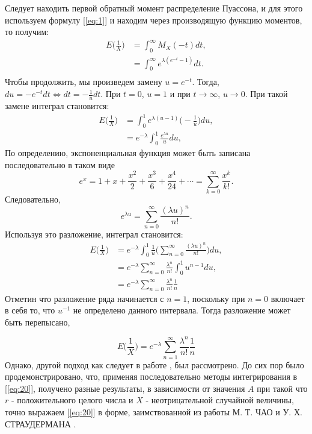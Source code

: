 \documentclass[13pt]{article}
\begin{document}
Следует находить первой обратный момент распределение Пуассона, и для этого используем формулу [\ref{eq:1}] и находим через производящую функцию моментов, то получим:
\begin{align*}
    E\bigg(\frac{1}{X}\bigg) &= \int_{0}^{\infty} M_{X}(-t)dt, \\
    &= \int_{0}^{\infty} e^{\lambda (e^{-t}-1)}dt.\\
\end{align*}
Чтобы продолжить, мы произведем замену $u = e^{-t}$. Тогда, $du =-e^{-t}dt \Longleftrightarrow dt = -\frac{1}{u}dt$. При $t = 0$, $u=1$ и при $t \to \infty$, $u \to 0$. При такой замене интеграл становится:
\begin{align*}
    E\bigg(\frac{1}{X}\bigg) &= \int_{0}^{1} e^{\lambda(u - 1)}\bigg(-\frac{1}{u} \bigg)du,\\
    &= e^{-\lambda} \int_{0}^{1} \frac{e^{\lambda u}}{u}du,
\end{align*}
По определению, экспоненциальная функция может быть записана последовательно в таком виде
\[
e^{x} = 1 + x + \frac{x^{2}}{2} + \frac{x^3}{6}+ \frac{x^4}{24}+\cdots = \sum_{k=0}^{\infty}\frac{x^k}{k!}.
\]
Следовательно, 
\[
e^{\lambda u} = \sum_{n=0}^{\infty} \frac{(\lambda u)^{n}}{n!}.
\]
Используя это разложение, интеграл становится:
\begin{align*}
    E\bigg(\frac{1}{X}\bigg) &= e^{-\lambda} \int_{0}^{1} \frac{1}{u}\bigg( \sum_{n=0}^{\infty} \frac{(\lambda u)^{n}}{n!} \bigg) du ,\\
    &= e^{-\lambda} \sum_{n=0}^{\infty} \frac{\lambda^{n}}{n!} \int_{0}^{1} u^{n-1} du, \\
    &= e^{-\lambda} \sum_{n=0}^{\infty} \frac{\lambda^{n}}{n!} \frac{1}{n}
\end{align*}
Отметин что разложение ряда начинается с $n=1$, поскольку при $n=0$ включает в себя то, что $u^{-1}$ не определено  данного интервала. Тогда разложение может быть перепысано,

\begin{equation}\label{eq:(22)}
    E\bigg(\frac{1}{X}\bigg) = e^{-\lambda} \sum_{n=1}^{\infty} \frac{\lambda^{n}}{n!} \frac{1}{n}
\end{equation}
Однако, другой подход как следует в работе \cite{chao1972negative}, был рассмотрено.  До сих пор было продемонстрировано, что, применяя последовательно методы интегрирования в [\ref{eq:20}], получено разные результаты, в зависимости от значения $A$ при такой что $r$ - положительного целого числа и $X$ - неотрицательной случайной величины, точно выражаем [\ref{eq:20}] в форме, заимствованной из работы М. Т. ЧАО и У. Х. СТРАУДЕРМАНА \cite{chao1972negative}.\par
\end{document}
